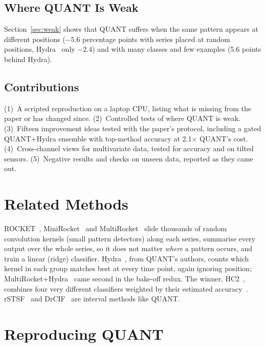 \documentclass[conference]{IEEEtran}
\begin{document}
\subsection{Where QUANT Is Weak}
Section~\ref{sec:weak} shows that QUANT suffers when the same pattern appears at different positions ($-5.6$ percentage points with series placed at random positions, Hydra~\cite{hydra} only $-2.4$) and with many classes and few examples (5.6 points behind Hydra).

\subsection{Contributions}
(1)~A scripted reproduction on a laptop CPU, listing what is missing from the paper or has changed since. (2)~Controlled tests of where QUANT is weak. (3)~Fifteen improvement ideas tested with the paper's protocol, including a gated QUANT+Hydra ensemble with top-method accuracy at 2.1$\times$ QUANT's cost. (4)~Cross-channel views for multivariate data, tested for accuracy and on tilted sensors. (5)~Negative results and checks on unseen data, reported as they came out.

\section{Related Methods}
\label{sec:related}
ROCKET~\cite{rocket}, MiniRocket~\cite{minirocket} and MultiRocket~\cite{multirocket} slide thousands of random convolution kernels (small pattern detectors) along each series, summarise every output over the whole series, so it does not matter \emph{where} a pattern occurs, and train a linear (ridge) classifier. Hydra~\cite{hydra}, from QUANT's authors, counts which kernel in each group matches best at every time point, again ignoring position; MultiRocket+Hydra~\cite{hydra} came second in the bake-off redux. The winner, HC2~\cite{hc2}, combines four very different classifiers weighted by their estimated accuracy~\cite{cawpe}. rSTSF~\cite{rstsf} and DrCIF~\cite{hc2} are interval methods like QUANT.

\section{Reproducing QUANT}
\label{sec:repro}
\end{document}
